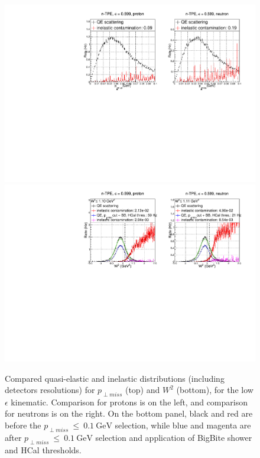 \begin{figure}[h]
  \centering
    \includegraphics[width=12cm]{Plots/gen-tpe_le_pperp_acc.pdf}
    \includegraphics[width=12cm]{Plots/gen-tpe_le_W2_acc.pdf}
    \caption{Compared quasi-elastic and inelastic distributions (including detectors resolutions) for $p_{\perp miss}$ (top) and $W^2$ (bottom), for the low $\epsilon$ kinematic. Comparison for protons is on the left, and comparison for neutrons is on the right. On the bottom panel, black and red are before the $p_{\perp miss}~\leq~0.1~\mathrm{GeV}$ selection, while blue and magenta are after $p_{\perp miss}~\leq~0.1~\mathrm{GeV}$ selection and application of BigBite shower and HCal thresholds.}
    \label{fig:inel_contam_le}
\end{figure}
